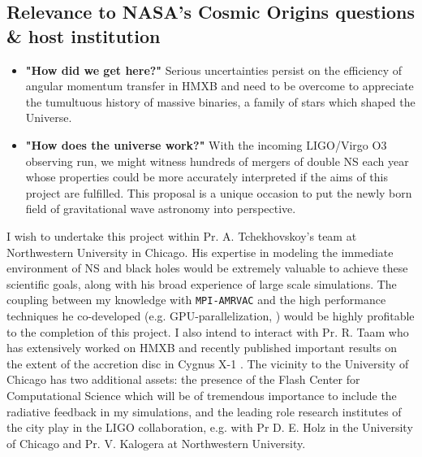 \documentclass[letterpaper,12pt,onecolumn]{article}
\makeatletter
\newcommand*{\hmxb}{HMXB\@\xspace}
\newcommand*{\ns}{NS\@\xspace}
\newcommand*{\eg}{e.g.\@\xspace}
\makeatother
\begin{document}
\subsection*{Relevance to NASA's Cosmic Origins questions \& host institution}

\begin{itemize}[label={},leftmargin=0.in]
\item \textbf{"How did we get here?"} Serious uncertainties persist on the efficiency of angular momentum transfer in \hmxb and need to be overcome to appreciate the tumultuous history of massive binaries, a family of stars which shaped the Universe.
\item \textbf{"How does the universe work?"} With the incoming LIGO/Virgo O3 observing run, we might witness hundreds of mergers of double \ns each year whose properties could be more accurately interpreted if the aims of this project are fulfilled. This proposal is a unique occasion to put the newly born field of gravitational wave astronomy into perspective.
\end{itemize}



I wish to undertake this project within Pr. A. Tchekhovskoy's team at Northwestern University in Chicago. His expertise in modeling the immediate environment of \ns and black holes would be extremely valuable to achieve these scientific goals, along with his broad experience of large scale simulations. The coupling between my knowledge with \texttt{MPI-AMRVAC} and the high performance techniques he co-developed (\eg GPU-parallelization, \citep{Liska2017}) would be highly profitable to the completion of this project. I also intend to interact with Pr. R. Taam who has extensively worked on \hmxb and recently published important results on the extent of the accretion disc in Cygnus X-1 \citep{Taam2018}. The vicinity to the University of Chicago has two additional assets: the presence of the Flash Center for Computational Science which will be of tremendous importance to include the radiative feedback in my simulations, and the leading role research institutes of the city play in the LIGO collaboration, \eg with Pr D. E. Holz in the University of Chicago and Pr. V. Kalogera at Northwestern University.
\end{document}
